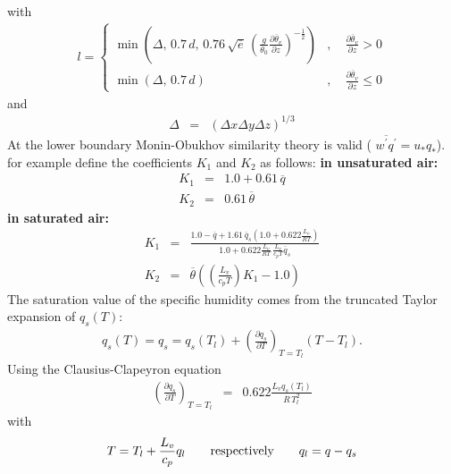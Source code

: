 \documentclass[11pt,a4paper]{scrartcl}
\begin{document}
with 
\begin{eqnarray}
 l = \begin{cases}
  \min\left(\Delta,\,  0.7\,d,\, 0.76\, \sqrt{\overline e}\,\left(\frac{g}{\theta_{0}}\frac{\partial \overline\theta_{v}}
  {\partial z}\right)^{-\frac{1}{2}}\right) & , \quad \frac{\partial \overline\theta_{v}}{\partial z} > 0\\
  \min\left(\Delta,\, 0.7\, d\right)   & , \quad \frac{\partial \overline\theta_{v}}{\partial z} \leq 0 
  \end{cases}
 \label{eq:l}
\end{eqnarray}
and 
\begin{eqnarray}
 \Delta & = & \left(\Delta x \Delta y \Delta z\right)^{1/3}
 \label{eq:delta}
\end{eqnarray}
At the lower boundary Monin-Obukhov similarity theory is valid ( $\overline{w^{'}q^{'}}=u_{\ast}q_{\ast}$). 
\newline
\cite{cuijpers93} for example define the coefficients $K_{1}$ and $K_{2}$ as follows:\newline
{\bf\textsf{in unsaturated air:}}
\begin{eqnarray}
 \label{eq:K_1}
  K_{1} & = & 1.0 + 0.61\, \overline q \\
 \label{eq:K_2}
  K_{2} & = &  0.61\, \overline{\theta}
\end{eqnarray}
{\bf\textsf{in saturated air:}}
\begin{eqnarray}
 \label{eq:K_1_sat}
  K_{1} & = & \frac{1.0-\overline q + 1.61\,\overline q_{s}\left(1.0 + 0.622\frac{L_{v}}{RT}\right)}
  {1.0 + 0.622\frac{L_{v}}{RT}\,\frac{L_{v}}{c_{p}T}\overline q_{s}}  \\
 \label{eq:K_2_sat}
  K_{2} & = &  \overline{\theta}\left(\left(\frac{L_{v}}{c_{p}T}\right)K_{1}-1.0\right)
\end{eqnarray}
The saturation value of the specific humidity comes from the truncated Taylor expansion of $q_{s}(T)$:
\begin{eqnarray}
 q_{s}(T) = q_{s} = q_{s}\left(T_{l}\right) 
 + \left(\frac{\partial q_{s}}{\partial T}\right)_{T=T_{l}} (T-T_{l}). 
 \label{eq:qs1}
\end{eqnarray}
Using the Clausius-Clapeyron equation 
\begin{eqnarray}
 \left(\frac{\partial q_{s}}{\partial T}\right)_{T=T_{l}} & = & 
  0.622\frac{L_{v}q_{s}(T_{l})}{R\,T_{l}^{2}}
 \label{eq:clausius}
\end{eqnarray}
with 
\begin{eqnarray}
  T = T_{l} + \frac{L_{v}}{c_{p}}q_{l} \qquad \textnormal{respectively}  \qquad q_{l} = q - q_{s}
 \label{eq:T}
\end{eqnarray}
\end{document}
